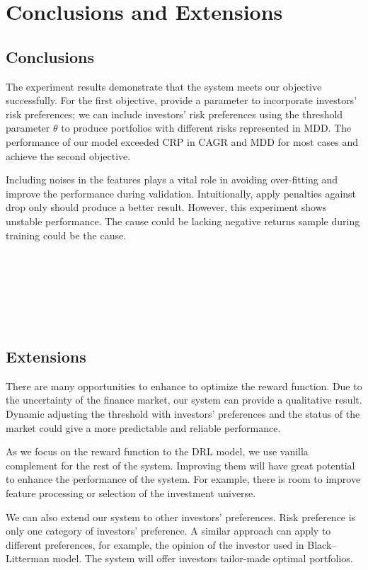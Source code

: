 \chapter{Conclusions and Extensions}
\label{c:conclusion}
\section{Conclusions}


The experiment results demonstrate that the system meets our objective successfully. 
For the first objective, provide a parameter to incorporate investors' risk preferences; we can include investors' risk preferences using the threshold parameter $\theta$ to produce portfolios with different risks represented in MDD.
The performance of our model exceeded CRP in CAGR and MDD for most cases and achieve the second objective.
\par
Including noises in the features plays a vital role in avoiding over-fitting and improve the performance during validation. Intuitionally, apply penalties against drop only should produce a better result. However, this experiment shows unstable performance. The cause could be lacking negative returns sample during training could be the cause.
\\
\\
\\
\\
\\
\\
\\
\section{Extensions}

There are many opportunities to enhance to optimize the reward function. Due to the uncertainty of the finance market, our system can provide a qualitative result. Dynamic adjusting the threshold with investors' preferences and the status of the market could give a more predictable and reliable performance.

As we focus on the reward function to the DRL model, we use vanilla complement for the rest of the system. Improving them will have great potential to enhance the performance of the system. For example, there is room to improve feature processing or selection of the investment universe.

\par
We can also extend our system to other investors' preferences. Risk preference is only one category of investors' preference. A similar approach can apply to different preferences, for example, the opinion of the investor used in Black–Litterman model\cite{black1992global}. The system will offer investors tailor-made optimal portfolios.